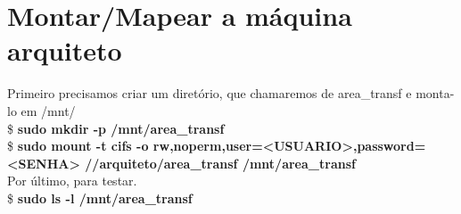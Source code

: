 \documentclass[a4paper,10pt]{article}
\begin{document}
\section{Montar/Mapear a máquina arquiteto}
Primeiro precisamos criar um diretório, que chamaremos de area\_transf e monta-lo em /mnt/\\
\$ \textbf{sudo mkdir -p /mnt/area\_transf}\\
\$ \textbf{sudo mount -t cifs -o rw,noperm,user=<USUARIO>,password=<SENHA> //arquiteto/area\_transf /mnt/area\_transf}\\
Por último, para testar.\\
\$ \textbf{sudo ls -l /mnt/area\_transf}\\
\end{document}

